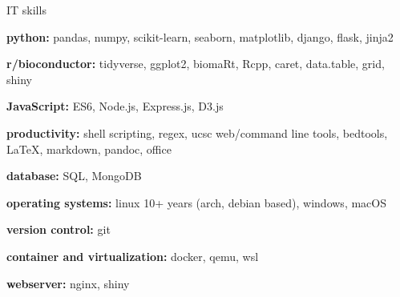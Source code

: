 

\begin{cvskills}
  \cvskill
    {IT skills} %
    {
      \begin{cvitems}
        \item {\textbf{python:} pandas, numpy, scikit-learn, seaborn, matplotlib, django, flask, jinja2}
        \item {\textbf{r/bioconductor:} tidyverse, ggplot2, biomaRt, Rcpp, caret, data.table, grid, shiny}
        \item {\textbf{JavaScript:} ES6, Node.js, Express.js, D3.js}
        \item {\textbf{productivity:} shell scripting, regex, ucsc web/command line tools, bedtools, LaTeX, \newline markdown, pandoc, office}
        \item {\textbf{database:} SQL, MongoDB}
        \item {\textbf{operating systems:} linux 10+ years (arch, debian based), windows, macOS}
        \item {\textbf{version control:} git}
        \item {\textbf{container and virtualization:} docker, qemu, wsl}
        \item {\textbf{webserver:} nginx, shiny}
      \end{cvitems}
      }
      

\end{cvskills}
